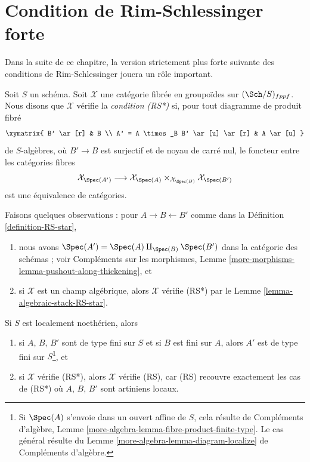 \section{Condition de Rim-Schlessinger forte}
\label{section-RS-star}

\noindent
Dans la suite de ce chapitre, la version strictement plus forte suivante
des conditions de Rim-Schlessinger jouera un rôle important.

\begin{definition}
\label{definition-RS-star}
Soit $S$ un schéma. Soit $\mathcal{X}$ une catégorie
fibrée en groupoïdes sur $(\Sch/S)_{fppf}$. Nous disons que $\mathcal{X}$
vérifie la {\it condition (RS*)} si, pour tout diagramme de produit fibré
$$
\xymatrix{
B' \ar[r] & B \\
A' = A \times_B B' \ar[u] \ar[r] & A \ar[u]
}
$$
de $S$-algèbres, où $B' \to B$ est surjectif et de noyau de carré nul,
le foncteur entre les catégories fibres
$$
\mathcal{X}_{\Spec(A')}
\longrightarrow
\mathcal{X}_{\Spec(A)} \times_{\mathcal{X}_{\Spec(B)}} \mathcal{X}_{\Spec(B')}
$$
est une équivalence de catégories.
\end{definition}

\noindent
Faisons quelques observations :
pour $A \to B \leftarrow B'$ comme dans la Définition \ref{definition-RS-star},
\begin{enumerate}
\item nous avons $\Spec(A') = \Spec(A) \amalg_{\Spec(B)} \Spec(B')$
dans la catégorie des schémas ; voir
Compléments sur les morphismes, Lemme \ref{more-morphisms-lemma-pushout-along-thickening},
et
\item si $\mathcal{X}$ est un champ algébrique, alors $\mathcal{X}$ vérifie
(RS*) par le Lemme \ref{lemma-algebraic-stack-RS-star}.
\end{enumerate}
Si $S$ est localement noethérien, alors
\begin{enumerate}
\item[(3)] si $A$, $B$, $B'$ sont de type fini sur $S$ et si
$B$ est fini sur $A$, alors $A'$ est de type fini sur
$S$\footnote{Si $\Spec(A)$ s'envoie dans un ouvert affine de $S$,
cela résulte de
Compléments d'algèbre, Lemme \ref{more-algebra-lemma-fibre-product-finite-type}.
Le cas général résulte du
Lemme \ref{more-algebra-lemma-diagram-localize} de Compléments d'algèbre.}, et
\item[(4)] si $\mathcal{X}$ vérifie (RS*), alors $\mathcal{X}$ vérifie (RS),
car (RS) recouvre exactement les cas de (RS*) où
$A$, $B$, $B'$ sont artiniens locaux.
\end{enumerate}

